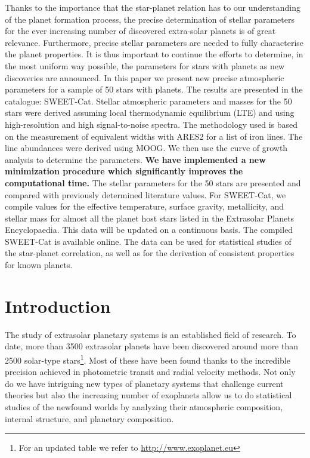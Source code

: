 \documentclass{aa}
\begin{document}
\abstract
{Thanks to the importance that the star-planet relation has to our understanding
of the planet formation process, the precise determination of stellar parameters
for the ever increasing number of discovered extra-solar planets is of great
relevance. Furthermore, precise stellar parameters are needed to fully
characterise the planet properties. It is thus important to continue the efforts
to determine, in the most uniform way possible, the parameters for stars with
planets as new discoveries are announced.}
{In this paper we present new precise atmospheric parameters for a sample of 50
stars with planets. The results are presented in the catalogue: SWEET-Cat.}
{Stellar atmospheric parameters and masses for the 50 stars were derived
assuming local thermodynamic equilibrium (LTE) and using high-resolution and
high signal-to-noise spectra. The methodology used is based on the measurement
of equivalent widths with ARES2 for a list of iron lines. The line
abundances were derived using MOOG. We then use the curve of growth analysis to
determine the parameters. {\bf We have implemented a new minimization procedure which
significantly improves the computational time.}}
{The stellar parameters for the 50 stars are presented and compared with
previously determined literature values. For SWEET-Cat, we compile values
for the effective temperature, surface gravity, metallicity, and stellar mass
for almost all the planet host stars listed in the Extrasolar Planets
Encyclopaedia. This data will be updated on a continuous basis. The compiled
SWEET-Cat is available online. The data can be used for statistical studies of
the star-planet correlation, as well as for the derivation of consistent
properties for known planets.}
{}


\maketitle



\section{Introduction}
\label{sec:introduction}
The study of extrasolar planetary systems is an established field of research.
To date, more than 3500 extrasolar planets have been discovered around more than
2500 solar-type stars\footnote{For an updated table we refer to
\url{http://www.exoplanet.eu}}. Most of these have been found thanks to the
incredible precision achieved in photometric transit and radial velocity
methods. Not only do we have intriguing new types of planetary systems that
challenge current theories but also the increasing number of exoplanets allow us
to do statistical studies of the newfound worlds by analyzing their atmospheric
composition, internal structure, and planetary composition.
\end{document}
